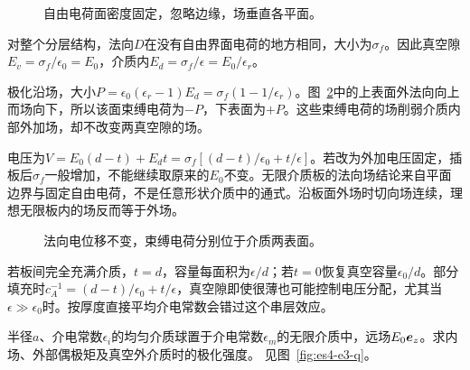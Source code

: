\begin{figure}[H]\centering
{}
\caption{自由电荷面密度固定，忽略边缘，场垂直各平面。}\label{fig:es4-e2-q}
\end{figure}
\begin{solution}
对整个分层结构，法向$D$在没有自由界面电荷的地方相同，大小为$\sigma_f$。因此真空隙$E_v=\sigma_f/\epsilon_0=E_0$，介质内$E_d=\sigma_f/\epsilon=E_0/\epsilon_r$。

极化沿场，大小$P=\epsilon_0(\epsilon_r-1)E_d=\sigma_f(1-1/\epsilon_r)$。图~\ref{fig:es4-e2-s}中的上表面外法向向上而场向下，所以该面束缚电荷为$-P$，下表面为$+P$。这些束缚电荷的场削弱介质内部外加场，却不改变两真空隙的场。

电压为$V=E_0(d-t)+E_dt=\sigma_f[(d-t)/\epsilon_0+t/\epsilon]$。若改为外加电压固定，插板后$\sigma_f$一般增加，不能继续取原来的$E_0$不变。无限介质板的法向场结论来自平面边界与固定自由电荷，不是任意形状介质中的通式。沿板面外场时切向场连续，理想无限板内的场反而等于外场。
\begin{figure}[H]\centering
{}
\caption{法向电位移不变，束缚电荷分别位于介质两表面。}\label{fig:es4-e2-s}
\end{figure}


若板间完全充满介质，$t=d$，容量每面积为$\epsilon/d$；若$t=0$恢复真空容量$\epsilon_0/d$。部分填充时$c_A^{-1}=(d-t)/\epsilon_0+t/\epsilon$，真空隙即使很薄也可能控制电压分配，尤其当$\epsilon\gg\epsilon_0$时。按厚度直接平均介电常数会错过这个串层效应。
\end{solution}

\begin{example}[介质球在匀强场中的自洽极化]\label{ex:es4-e3}
半径$a$、介电常数$\epsilon_i$的均匀介质球置于介电常数$\epsilon_m$的无限介质中，远场$E_0\bm{e}_z$。求内场、外部偶极矩及真空外介质时的极化强度。 见图~\ref{fig:es4-e3-q}。
\end{example}

